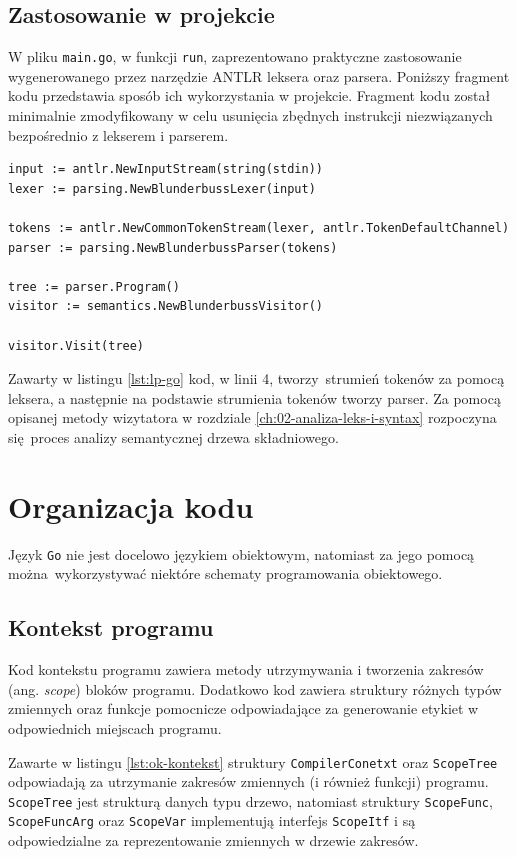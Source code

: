 \newpage
\subsection{Zastosowanie w projekcie}

W pliku \verb|main.go|, w funkcji \verb|run|, zaprezentowano praktyczne zastosowanie wygenerowanego przez narzędzie ANTLR leksera oraz parsera. Poniższy fragment kodu przedstawia sposób ich wykorzystania w projekcie. Fragment kodu został minimalnie zmodyfikowany w celu usunięcia zbędnych instrukcji niezwiązanych bezpośrednio z lekserem i parserem.


\begin{lstlisting}[caption={Zastosowanie leksera i parsera w go}, label={lst:lp-go}]
input := antlr.NewInputStream(string(stdin))
lexer := parsing.NewBlunderbussLexer(input)

tokens := antlr.NewCommonTokenStream(lexer, antlr.TokenDefaultChannel)
parser := parsing.NewBlunderbussParser(tokens)

tree := parser.Program()
visitor := semantics.NewBlunderbussVisitor()

visitor.Visit(tree)
\end{lstlisting}

Zawarty w listingu \ref{lst:lp-go} kod, w linii 4, tworzy strumień tokenów za pomocą leksera, a następnie na podstawie strumienia tokenów tworzy parser. Za pomocą opisanej metody wizytatora w rozdziale \ref{ch:02-analiza-leks-i-syntax} rozpoczyna się proces analizy semantycznej drzewa składniowego.

\section{Organizacja kodu}

Język \verb|Go| nie jest docelowo językiem obiektowym, natomiast za jego pomocą można wykorzystywać niektóre schematy programowania obiektowego.

\newpage
\subsection{Kontekst programu}

Kod kontekstu programu zawiera metody utrzymywania i tworzenia zakresów (ang. \textit{scope}) bloków programu. Dodatkowo kod zawiera struktury różnych typów zmiennych oraz funkcje pomocnicze odpowiadające za generowanie etykiet w odpowiednich miejscach programu.

Zawarte w listingu \ref{lst:ok-kontekst} struktury \verb|CompilerConetxt| oraz \verb|ScopeTree| odpowiadają za utrzymanie zakresów zmiennych (i również funkcji) programu. \verb|ScopeTree| jest strukturą danych typu drzewo, natomiast struktury \verb|ScopeFunc|, \verb|ScopeFuncArg| oraz \verb|ScopeVar| implementują interfejs \verb|ScopeItf| i są odpowiedzialne za reprezentowanie zmiennych w drzewie zakresów.

